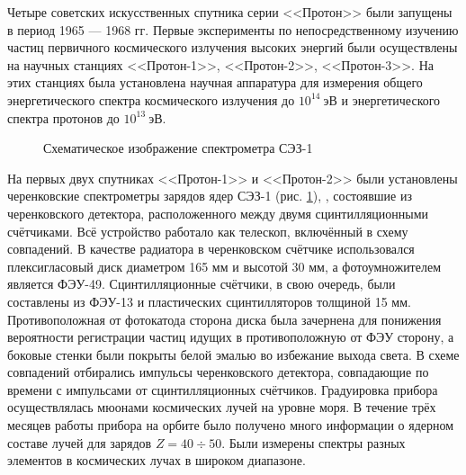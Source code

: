 \documentclass[12pt,a4paper]{report} %
\begin{document}
Четыре советских искусственных спутника серии <<Протон>> были запущены в период 1965 --- 1968 гг.
Первые эксперименты по непосредственному изучению частиц первичного космического излучения высоких энергий были осуществлены на научных станциях <<Протон-1>>, <<Протон-2>>, <<Протон-3>>. На этих станциях была установлена научная аппаратура для измерения общего энергетического спектра космического излучения до $10^{14}~эВ$ и энергетического спектра протонов до $10^{13}~эВ$.
\begin{figure}[th]
	\noindent{}
	\caption{Схематическое изображение спектрометра СЭЗ-1}
	\label{figSEZ1}
\end{figure}
На первых двух спутниках <<Протон-1>> и <<Протон-2>> были установлены черенковские спектрометры зарядов ядер СЭЗ-1 (рис. \ref{figSEZ1}), \cite{SEZ1}, состоявшие из черенковского детектора, расположенного между двумя сцинтилляционными счётчиками. Всё устройство работало как телескоп, включённый в схему совпадений. 
В качестве радиатора в черенковском счётчике использовался плексигласовый диск диаметром 165 мм и высотой 30 мм, а фотоумножителем является ФЭУ-49. 
Сцинтилляционные счётчики, в свою очередь, были составлены из ФЭУ-13 и пластических сцинтилляторов толщиной 15 мм. 
Противоположная от фотокатода сторона диска была зачернена для понижения вероятности регистрации частиц идущих в противоположную от ФЭУ сторону, а боковые стенки были покрыты белой эмалью во избежание выхода света. 
В схеме совпадений отбирались импульсы черенковского детектора, совпадающие по времени с импульсами от сцинтилляционных счётчиков. 
Градуировка прибора осуществлялась мюонами космических лучей на уровне моря. 
В течение трёх месяцев работы прибора на орбите было получено много информации о ядерном составе лучей для зарядов $Z=40\div50$. Были измерены спектры разных элементов в космических лучах в широком диапазоне. 
\end{document}
